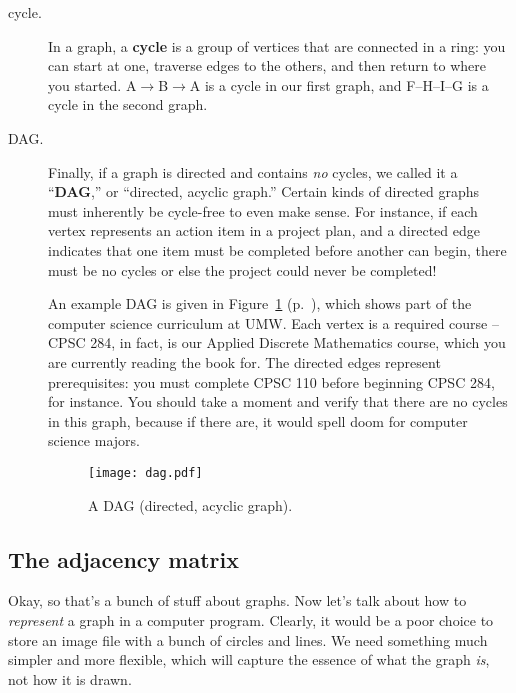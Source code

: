 \begin{alttitles}
\begin{description}

\item[cycle.] In a graph, a \textbf{cycle} is a group of vertices that are
connected in a ring: you can start at one, traverse edges to the others, and
then return to where you started. A$\rightarrow$B$\rightarrow$A is a cycle in
our first graph, and F--H--I--G is a cycle in the second graph.


\item[DAG.] Finally, if a graph is directed and contains \textit{no} cycles, we
called it a ``\textbf{DAG},'' or ``directed, acyclic graph.'' Certain kinds of
directed graphs must inherently be cycle-free to even make sense. For instance,
if each vertex represents an action item in a project plan, and a directed edge
indicates that one item must be completed before another can begin, there must
be no cycles or else the project could never be completed!


An example DAG is given in Figure~\ref{fig:dag} (p.~\pageref{fig:dag}), which
shows part of the computer science curriculum at UMW. Each vertex is a required
course -- CPSC 284, in fact, is our Applied Discrete Mathematics course, which
you are currently reading the book for. The directed edges represent
prerequisites: you must complete CPSC 110 before beginning CPSC 284, for
instance. You should take a moment and verify that there are no cycles in this
graph, because if there are, it would spell doom for computer science majors.

\begin{figure}[ht]
\centering
\texttt{[image: dag.pdf]}
\caption{A DAG (directed, acyclic graph).}
\label{fig:dag}
\end{figure}

\end{description}

\subsection{The adjacency matrix}

Okay, so that's a bunch of stuff about graphs. Now let's talk about how to
\textit{represent} a graph in a computer program. Clearly, it would be a poor
choice to store an image file with a bunch of circles and lines. We need
something much simpler and more flexible, which will capture the essence of
what the graph \textit{is}, not how it is drawn.


\end{alttitles}
